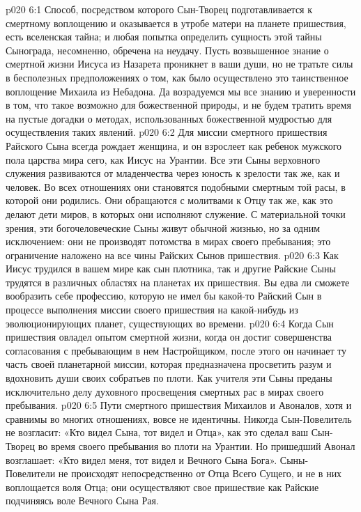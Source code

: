\vs p020 6:1 Способ, посредством которого Сын\hyp{}Творец подготавливается к смертному воплощению и оказывается в утробе матери на планете пришествия, есть вселенская тайна; и любая попытка определить сущность этой тайны Сынограда, несомненно, обречена на неудачу. Пусть возвышенное знание о смертной жизни Иисуса из Назарета проникнет в ваши души, но не тратьте силы в бесполезных предположениях о том, как было осуществлено это таинственное воплощение Михаила из Небадона. Да возрадуемся мы все знанию и уверенности в том, что такое возможно для божественной природы, и не будем тратить время на пустые догадки о методах, использованных божественной мудростью для осуществления таких явлений.
\vs p020 6:2 \pc Для миссии смертного пришествия Райского Сына всегда рождает женщина, и он взрослеет как ребенок мужского пола царства мира сего, как Иисус на Урантии. Все эти Сыны верховного служения развиваются от младенчества через юность к зрелости так же, как и человек. Во всех отношениях они становятся подобными смертным той расы, в которой они родились. Они обращаются с молитвами к Отцу так же, как это делают дети миров, в которых они исполняют служение. С материальной точки зрения, эти богочеловеческие Сыны живут обычной жизнью, но за одним исключением: они не производят потомства в мирах своего пребывания; это ограничение наложено на все чины Райских Сынов пришествия.
\vs p020 6:3 Как Иисус трудился в вашем мире как сын плотника, так и другие Райские Сыны трудятся в различных областях на планетах их пришествия. Вы едва ли сможете вообразить себе профессию, которую не имел бы какой\hyp{}то Райский Сын в процессе выполнения миссии своего пришествия на какой\hyp{}нибудь из эволюционирующих планет, существующих во времени.
\vs p020 6:4 Когда Сын пришествия овладел опытом смертной жизни, когда он достиг совершенства согласования с пребывающим в нем Настройщиком, после этого он начинает ту часть своей планетарной миссии, которая предназначена просветить разум и вдохновить души своих собратьев по плоти. Как учителя эти Сыны преданы исключительно делу духовного просвещения смертных рас в мирах своего пребывания.
\vs p020 6:5 \pc Пути смертного пришествия Михаилов и Авоналов, хотя и сравнимы во многих отношениях, вовсе не идентичны. Никогда Сын\hyp{}Повелитель не возгласит: «Кто видел Сына, тот видел и Отца», как это сделал ваш Сын\hyp{}Творец во время своего пребывания во плоти на Урантии. Но пришедший Авонал возглашает: «Кто видел меня, тот видел и Вечного Сына Бога». Сыны\hyp{}Повелители не происходят непосредственно от Отца Всего Сущего, и не в них воплощается воля Отца; они осуществляют свое пришествие как Райские  подчиняясь воле Вечного Сына Рая.
